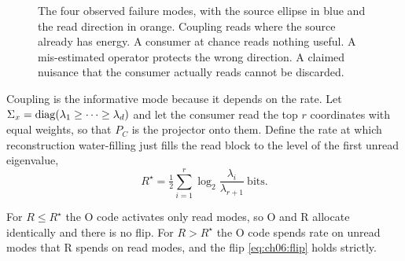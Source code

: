 \begin{figure}[tbp]\centering
{}
\caption{The four observed failure modes, with the source ellipse in blue and the read direction in orange. Coupling reads where the source already has energy. A consumer at chance reads nothing useful. A mis-estimated operator protects the wrong direction. A claimed nuisance that the consumer actually reads cannot be discarded.}
\label{fig:ch06:modes}
\end{figure}

Coupling is the informative mode because it depends on the rate. Let $\Sigma_x=\operatorname{diag}(\lambda_1\ge\dots\ge\lambda_d)$ and let the consumer read the top $r$ coordinates with equal weights, so that $P_C$ is the projector onto them. Define the rate at which reconstruction water-filling just fills the read block to the level of the first unread eigenvalue,
\begin{equation}\label{eq:ch06:rstar}
R^\star=\tfrac12\sum_{i=1}^r\log_2\frac{\lambda_i}{\lambda_{r+1}}\ \text{bits}.
\end{equation}

\begin{proposition}\label{prop:ch06:coupling}
For $R\le R^\star$ the O code activates only read modes, so O and R allocate identically and there is no flip. For $R>R^\star$ the O code spends rate on unread modes that R spends on read modes, and the flip \cref{eq:ch06:flip} holds strictly.
\end{proposition}

